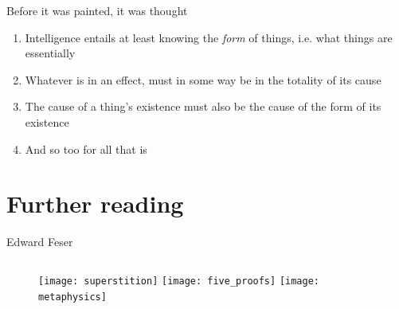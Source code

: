 \documentclass[xcolor=dvipsnames]{beamer}
\begin{document}
\begin{frame}[fragile]{Before it was painted, it was thought}
  \begin{enumerate}
  \item Intelligence entails at least knowing the \emph{form} of things, i.e. what things are essentially \vspace{5mm}
  \item Whatever is in an effect, must in some way be in the totality of its cause \vspace{5mm}
  \item The cause of a thing's existence must also be the cause of the form of its existence \vspace{5mm}
  \item And so too for all that is \vspace{5mm}
  \end{enumerate}
\end{frame}


\section{Further reading}


\begin{frame}{Edward Feser}
\begin{figure}
  \centering
  \begin{columns}
    \centering
    \texttt{[image: superstition]}
    \centering
    \texttt{[image: five\_proofs]}
    \centering
    \texttt{[image: metaphysics]}
  \end{columns}
\end{figure}
\end{frame}
\end{document}
